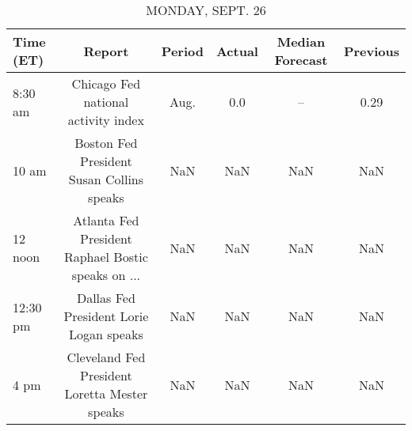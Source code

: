 \documentclass{article}%
\begin{document}
%
\normalsize%


\begin{table}[htbp]%
\caption{MONDAY, SEPT. 26}%
\centering%
\begin{adjustbox}{width=1\textwidth}%
\begin{tabular}{lccccc}
\toprule
Time (ET) &                                             Report & Period & Actual & Median Forecast & Previous \\
\midrule
  8:30 am &                Chicago Fed national activity index &   Aug. &    0.0 &              -- &     0.29 \\
    10 am &          Boston Fed President Susan Collins speaks &    NaN &    NaN &             NaN &      NaN \\
  12 noon & Atlanta Fed President Raphael Bostic speaks on ... &    NaN &    NaN &             NaN &      NaN \\
 12:30 pm &            Dallas Fed President Lorie Logan speaks &    NaN &    NaN &             NaN &      NaN \\
     4 pm &      Cleveland Fed President Loretta Mester speaks &    NaN &    NaN &             NaN &      NaN \\
\bottomrule
\end{tabular}
%
\end{adjustbox}%
\end{table}

%
\end{document}
